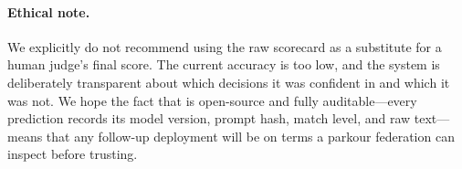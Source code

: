 \paragraph{Ethical note.}
We explicitly do not recommend using the raw \sys{} scorecard as a
substitute for a human judge's final score. The current accuracy is
too low, and the system is deliberately transparent about which
decisions it was confident in and which it was not. We hope the
fact that \sys{} is open-source and fully auditable---every
prediction records its model version, prompt hash, match level,
and raw text---means that any follow-up deployment will be on terms
a parkour federation can inspect before trusting.
